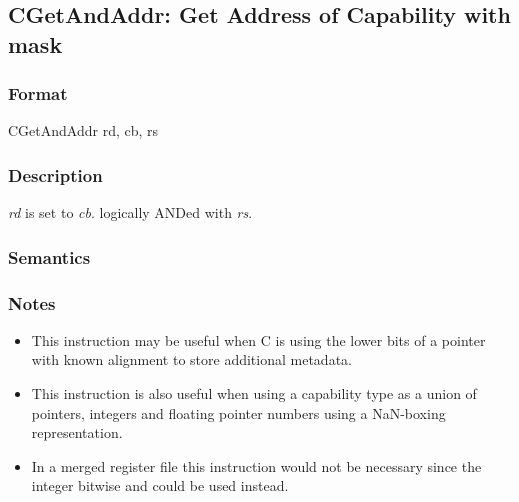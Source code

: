\clearpage
{}
{}
\subsection*{CGetAndAddr: Get Address of Capability with mask}

\subsubsection*{Format}

CGetAndAddr rd, cb, rs

\begin{center}
\end{center}

\subsubsection*{Description}

\emph{rd} is set to \emph{cb}.\caddr{}  logically ANDed with \emph{rs}.

\subsubsection*{Semantics}


\subsubsection*{Notes}

\begin{itemize}
\item This instruction may be useful when C is using the lower bits of a pointer with known alignment to store additional metadata.
\item This instruction is also useful when using a capability type as a union of pointers, integers and floating pointer numbers using a NaN-boxing representation.
\item In a merged register file this instruction would not be necessary since the integer bitwise and could be used instead.
\end{itemize}
